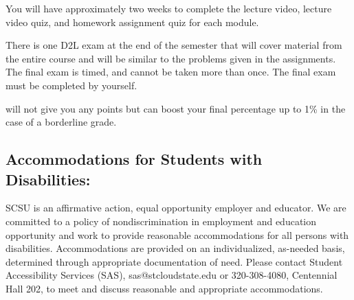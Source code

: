 \documentclass{tufte-handout}
\begin{document}
\begin{fullwidth}

\color{blue}You will have approximately two weeks to complete the lecture video, lecture video quiz, and homework assignment quiz for each module. \color{black}



 There is one D2L exam at the end of the semester that will cover material from the entire course and will be similar to the problems given in the assignments. The final exam is timed, and cannot be taken more than once. The final exam must be completed by yourself.



 will not give you any points but can boost your final percentage up to 1\% in the case of a borderline grade.






\subsection{Accommodations for Students with Disabilities: } 

SCSU is an affirmative action, equal opportunity employer and educator. We are committed to a policy of nondiscrimination in employment and education opportunity and work to provide reasonable accommodations for all persons with disabilities. Accommodations are provided on an individualized, as-needed basis, determined through appropriate documentation of need. Please contact Student Accessibility Services (SAS), sas@stcloudstate.edu or 320-308-4080, Centennial Hall 202, to meet and discuss reasonable and appropriate accommodations. 






\end{fullwidth}
\end{document}
